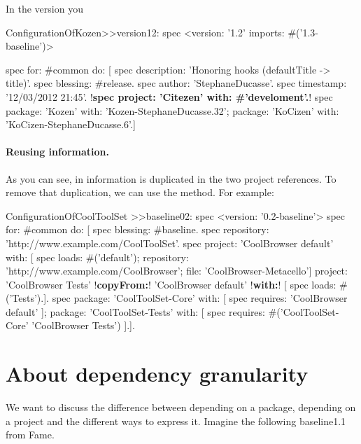 \documentclass[a4paper,10pt,twoside]{book}
\begin{document}
In the version you 
\begin{code}{}
ConfigurationOfKozen>>version12: spec
       <version: '1.2' imports: #('1.3-baseline')>

       spec for: #common do: [
               spec description: 'Honoring hooks (defaultTitle -> title)'.
               spec blessing: #release.
               spec author: 'StephaneDucasse'.
               spec timestamp: '12/03/2012 21:45'.
			  !\textbf{spec project: 'Citezen' with: \#'develoment'.}!
               spec 
                       package: 'Kozen' with: 'Kozen-StephaneDucasse.32';
                       package: 'KoCizen' with: 'KoCizen-StephaneDucasse.6'.]
\end{code}



\paragraph{Reusing information.}
As you can see, in  information is duplicated in the two project references. To remove that duplication, we can use the  method.  For example:

\begin{code}{}
ConfigurationOfCoolToolSet >>baseline02: spec 
       <version: '0.2-baseline'>
       spec for: #common do: [
              spec blessing: #baseline.
              spec repository: 'http://www.example.com/CoolToolSet'.
              spec
                    project: 'CoolBrowser default' with: [
                            spec
                                   loads: #('default');
                                   repository: 'http://www.example.com/CoolBrowser';
                                   file: 'CoolBrowser-Metacello']
                    project: 'CoolBrowser Tests' 
                            !\textbf{copyFrom:}! 'CoolBrowser default' 
                            !\textbf{with:}! [ spec loads: #('Tests').].
              spec 
                     package: 'CoolToolSet-Core' with: [ spec requires: 'CoolBrowser default' ];
                     package: 'CoolToolSet-Tests' with: [ 
                            spec requires: #('CoolToolSet-Core' 'CoolBrowser Tests') ].].                                   
\end{code}


\section{About dependency granularity}
We want to discuss the difference between depending on a package, depending on a project and the different ways to express it.
Imagine the following baseline1.1 from Fame. 
\end{document}
